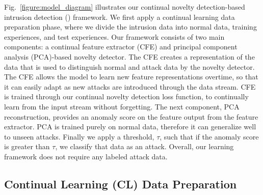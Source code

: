 Fig.~\ref{figure:model_diagram} illustrates our continual novelty detection-based intrusion detection (\Design{}) framework. We first apply a continual learning data preparation phase, where we divide the intrusion data into normal data, training experiences, and test experiences. Our framework consists of two main components: a continual feature extractor (CFE) and principal component analysis (PCA)-based novelty detector. The CFE creates a representation of the data that is used to distinguish normal and attack data by the novelty detector. The CFE allows the model to learn new feature representations overtime, so that it can easily adapt as new attacks are introduced through the data stream. CFE is trained through our continual novelty detection loss function, to continually learn from the input stream without forgetting. The next component, PCA reconstruction, provides an anomaly score on the feature output from the feature extractor. PCA is trained purely on normal data, therefore it can generalize well to unseen attacks. Finally we apply a threshold, $\tau$, such that if the anomaly score is greater than $\tau$, we classify that data as an attack. Overall, our learning framework does not require any labeled attack data.

\subsection{Continual Learning (CL) Data Preparation}
\label{section:data_preparation}


